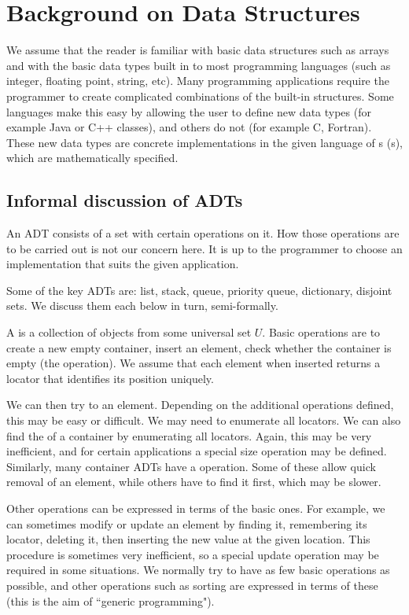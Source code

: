 \chapter{Background on Data Structures}
\label{ch:app:datastruct}

We assume that the reader is familiar with basic data structures such
as arrays and with the basic data types built in to most programming
languages (such as integer, floating point, string, etc). Many programming
applications require the programmer to create complicated combinations
of the built-in structures. Some languages make this easy by allowing
the user to define new data types (for example Java or C++ classes), and
others do not (for example C, Fortran). These new data types are concrete
implementations in the given language of s
(s), which are mathematically specified.

\section{Informal discussion of ADTs}
\label{sec:app:adt-informal}

An ADT consists of a set with certain operations on it. How those
operations are to be carried out is not our concern here. It is up to the
programmer to choose an implementation that suits the given application.

Some of the key ADTs are: list, stack, queue, priority queue, dictionary,
disjoint sets. We discuss them each below in turn, semi-formally. 

A  is a collection of objects from some universal
set $U$. Basic operations are to create a new empty container, insert an
element, check whether the container is empty (the  operation). 
We assume that each element when inserted returns a locator that identifies its 
position uniquely.

We can then try to  an element. Depending on the
additional operations defined, this may be easy or difficult. We may
need to enumerate all locators. We can also find the 
of a container by enumerating all locators. Again, this may be very
inefficient, and for certain applications a special size operation
may be defined. Similarly, many container ADTs have a 
 operation. Some of these allow quick removal of an
element, while others have to find it first, which may be slower.

Other operations can be expressed in terms of the basic ones. For
example, we can sometimes modify or update an element by finding it,
remembering its locator, deleting it, then inserting the new value at
the given location. This procedure is sometimes very inefficient, so a
special update operation may be required in some situations. We normally
try to have as few basic operations as possible, and other operations
such as sorting are expressed in terms of these (this is the aim of
``generic programming").

